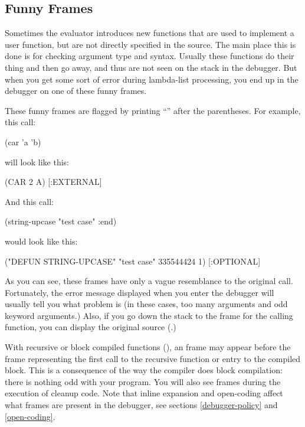 \subsection{Funny Frames}

Sometimes the evaluator introduces new functions that are used to implement a
user function, but are not directly specified in the source.  The main place
this is done is for checking argument type and syntax.  Usually these functions
do their thing and then go away, and thus are not seen on the stack in the
debugger.  But when you get some sort of error during lambda-list processing,
you end up in the debugger on one of these funny frames.

These funny frames are flagged by printing ``\code{[}\code{]}'' after the
parentheses.  For example, this call:

\begin{lisp}
(car 'a 'b)
\end{lisp}

will look like this:

\begin{example}
(CAR 2 A) [:EXTERNAL]
\end{example}

And this call:

\begin{lisp}
(string-upcase "test case" :end)
\end{lisp}

would look like this:

\begin{example}
("DEFUN STRING-UPCASE" "test case" 335544424 1) [:OPTIONAL]
\end{example}

As you can see, these frames have only a vague resemblance to the original
call.  Fortunately, the error message displayed when you enter the debugger
will usually tell you what problem is (in these cases, too many arguments
and odd keyword arguments.)  Also, if you go down the stack to the frame for
the calling function, you can display the original source (.)

With recursive or block compiled functions
(), an  frame may appear
before the frame representing the first call to the recursive function
or entry to the compiled block. This is a consequence of the way the
compiler does block compilation: there is nothing odd with your
program. You will also see  frames during the execution
of  cleanup code. Note that inline expansion and
open-coding affect what frames are present in the debugger, see
sections \ref{debugger-policy} and \ref{open-coding}.


